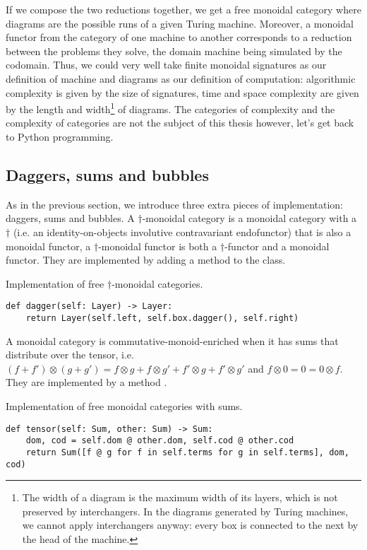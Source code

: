 If we compose the two reductions together, we get a free monoidal category where diagrams are the possible runs of a given Turing machine.
Moreover, a monoidal functor from the category of one machine to another corresponds to a reduction between the problems they solve, the domain machine being simulated by the codomain.
Thus, we could very well take finite monoidal signatures as our definition of machine and diagrams as our definition of computation: algorithmic complexity is given by the size of signatures, time and space complexity are given by the length and width\footnote
{The width of a diagram is the maximum width of its layers, which is not preserved by interchangers.
In the diagrams generated by Turing machines, we cannot apply interchangers anyway: every box is connected to the next by the head of the machine.}
of diagrams.
The categories of complexity and the complexity of categories are not the subject of this thesis however, let's get back to Python programming.

\subsection{Daggers, sums and bubbles}

As in the previous section, we introduce three extra pieces of implementation: daggers, sums and bubbles.
A $\dagger$-monoidal category is a monoidal category with a $\dagger$ (i.e. an identity-on-objects involutive contravariant endofunctor) that is also a monoidal functor, a $\dagger$-monoidal functor is both a $\dagger$-functor and a monoidal functor.
They are implemented by adding a  method to the  class.

\begin{python}
{\normalfont Implementation of free $\dagger$-monoidal categories.}

\begin{verbatim}
def dagger(self: Layer) -> Layer:
    return Layer(self.left, self.box.dagger(), self.right)
\end{verbatim}
\end{python}

A monoidal category is commutative-monoid-enriched when it has sums that distribute over the tensor, i.e. $(f + f') \otimes (g + g') = f \otimes g + f \otimes g' + f' \otimes g + f' \otimes g'$
and $f \otimes 0 = 0 = 0 \otimes f$.
They are implemented by a method .

\begin{python}
{\normalfont Implementation of free monoidal categories with sums.}

\begin{verbatim}
def tensor(self: Sum, other: Sum) -> Sum:
    dom, cod = self.dom @ other.dom, self.cod @ other.cod
    return Sum([f @ g for f in self.terms for g in self.terms], dom, cod)
\end{verbatim}
\end{python}

